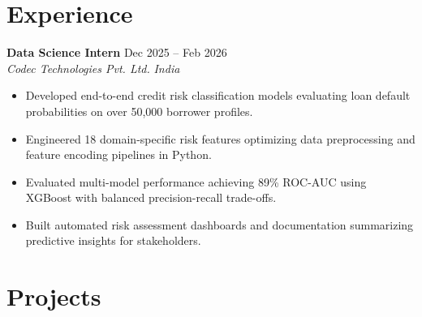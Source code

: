 \documentclass[a4paper,11pt]{article}
\newcommand{\resumeSubheading}[4]{
    \textbf{#1} \hfill #2 \\[1pt]
    \textit{#3} \hfill \textit{#4}
    \vspace{1.5pt}
}
\newcommand{\resumeItem}[1]{
    \item #1
}
\begin{document}

\section*{Experience}

\resumeSubheading
{Data Science Intern}{Dec 2025 -- Feb 2026}
{Codec Technologies Pvt. Ltd.}{India}

\begin{itemize}
    \resumeItem{Developed end-to-end credit risk classification models evaluating loan default probabilities on over 50,000 borrower profiles.}
    \resumeItem{Engineered 18 domain-specific risk features optimizing data preprocessing and feature encoding pipelines in Python.}
    \resumeItem{Evaluated multi-model performance achieving 89\% ROC-AUC using XGBoost with balanced precision-recall trade-offs.}
    \resumeItem{Built automated risk assessment dashboards and documentation summarizing predictive insights for stakeholders.}
\end{itemize}


\section*{Projects}
\end{document}

